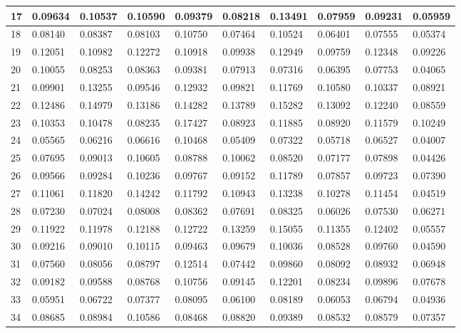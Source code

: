 \begin{table}[H]
{\begin{tabular}{|l|l|l|l|l|l|l|l|l|l|}
        17 & 0.09634 & 0.10537 & 0.10590 & 0.09379 & 0.08218 & 0.13491 & 0.07959 & 0.09231 & 0.05959 \\ \hline
        18 & 0.08140 & 0.08387 & 0.08103 & 0.10750 & 0.07464 & 0.10524 & 0.06401 & 0.07555 & 0.05374 \\ \hline
        19 & 0.12051 & 0.10982 & 0.12272 & 0.10918 & 0.09938 & 0.12949 & 0.09759 & 0.12348 & 0.09226 \\ \hline
        20 & 0.10055 & 0.08253 & 0.08363 & 0.09381 & 0.07913 & 0.07316 & 0.06395 & 0.07753 & 0.04065 \\ \hline
        21 & 0.09901 & 0.13255 & 0.09546 & 0.12932 & 0.09821 & 0.11769 & 0.10580 & 0.10337 & 0.08921 \\ \hline
        22 & 0.12486 & 0.14979 & 0.13186 & 0.14282 & 0.13789 & 0.15282 & 0.13092 & 0.12240 & 0.08559 \\ \hline
        23 & 0.10353 & 0.10478 & 0.08235 & 0.17427 & 0.08923 & 0.11885 & 0.08920 & 0.11579 & 0.10249 \\ \hline
        24 & 0.05565 & 0.06216 & 0.06616 & 0.10468 & 0.05409 & 0.07322 & 0.05718 & 0.06527 & 0.04007 \\ \hline
        25 & 0.07695 & 0.09013 & 0.10605 & 0.08788 & 0.10062 & 0.08520 & 0.07177 & 0.07898 & 0.04426 \\ \hline
        26 & 0.09566 & 0.09284 & 0.10236 & 0.09767 & 0.09152 & 0.11789 & 0.07857 & 0.09723 & 0.07390 \\ \hline
        27 & 0.11061 & 0.11820 & 0.14242 & 0.11792 & 0.10943 & 0.13238 & 0.10278 & 0.11454 & 0.04519 \\ \hline
        28 & 0.07230 & 0.07024 & 0.08008 & 0.08362 & 0.07691 & 0.08325 & 0.06026 & 0.07530 & 0.06271 \\ \hline
        29 & 0.11922 & 0.11978 & 0.12188 & 0.12722 & 0.13259 & 0.15055 & 0.11355 & 0.12402 & 0.05557 \\ \hline
        30 & 0.09216 & 0.09010 & 0.10115 & 0.09463 & 0.09679 & 0.10036 & 0.08528 & 0.09760 & 0.04590 \\ \hline
        31 & 0.07560 & 0.08056 & 0.08797 & 0.12514 & 0.07442 & 0.09860 & 0.08092 & 0.08932 & 0.06948 \\ \hline
        32 & 0.09182 & 0.09588 & 0.08768 & 0.10756 & 0.09145 & 0.12201 & 0.08234 & 0.09896 & 0.07678 \\ \hline
        33 & 0.05951 & 0.06722 & 0.07377 & 0.08095 & 0.06100 & 0.08189 & 0.06053 & 0.06794 & 0.04936 \\ \hline
        34 & 0.08685 & 0.08984 & 0.10586 & 0.08468 & 0.08820 & 0.09389 & 0.08532 & 0.08579 & 0.07357 \\ \hline

\end{tabular}}
\end{table}
